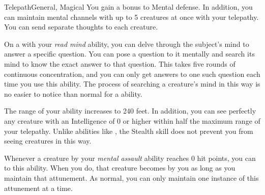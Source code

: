 \begin{feat}{Telepath}{General, Magical}
         You gain a  bonus to Mental defense.
        In addition, you can maintain mental channels with up to 5 creatures at once with your telepathy.
        You can send separate thoughts to each creature.

         On a  with your \textit{read mind} ability, you can delve through the subject's mind to answer a specific question.
        You can pose a question to it mentally and search its mind to know the exact answer to that question.
        This takes five rounds of continuous concentration, and you can only get answers to one such question each time you use this ability.
        The process of searching a creature's mind in this way is no easier to notice than normal for a  ability.

         The range of your  ability increases to 240 feet.
        In addition, you can see perfectly any creature with an Intelligence of 0 or higher within half the maximum range of your telepathy.
        Unlike abilities like , the Stealth skill does not prevent you from seeing creatures in this way.

         Whenever a creature \stunned by your \textit{mental assault} ability reaches 0 hit points, you can  to this ability.
        When you do, that creature becomes \dominated by you as long as you maintain that attunement.
        As normal, you can only maintain one instance of this attunement at a time.
    \end{feat}

